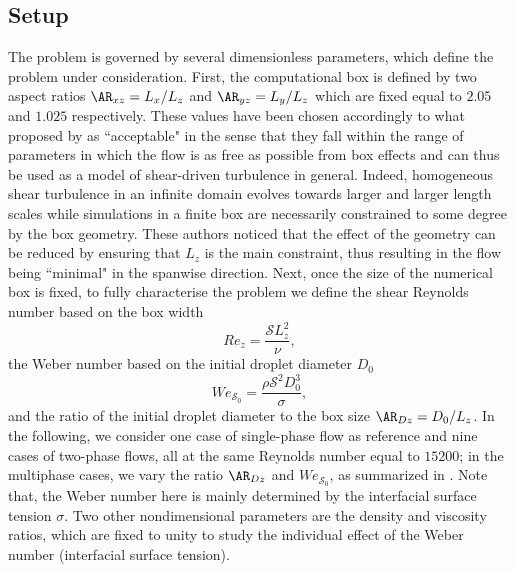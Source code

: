 \subsection{Setup}
The problem is governed by several dimensionless parameters, which define the problem under consideration. First, the computational box is defined by two aspect ratios $\AR_{xz} = L_x/L_z$ and $\AR_{yz} = L_y/L_z$ which are fixed equal to $2.05$ and $1.025$ respectively. These values have been chosen accordingly to what proposed by \cite{sekimoto_dong_jimenez_2016a} as ``acceptable" in the sense that they fall within the range of parameters in which the flow is as free as possible from box effects and can thus be used as a model of shear-driven turbulence in general. Indeed, homogeneous shear turbulence in an infinite domain evolves towards larger and larger length scales while simulations in a finite box are necessarily constrained to some degree by the box geometry. These authors noticed that the effect of the geometry can be reduced by ensuring that $L_z$ is the main constraint, thus resulting in the flow being ``minimal" in the spanwise direction. Next, once the size of the numerical box is fixed, to fully characterise the problem we define the shear Reynolds number based on the box width
\begin{equation}
Re_z = \frac{\mathcal{S} L_z^2}{\nu},
\end{equation}
the Weber number based on the initial droplet diameter $D_0$
\begin{equation}
\label{eq:wes}
We_{\mathcal{S}_0} = \frac{\rho \mathcal{S}^2 D_0^3}{\sigma},
\end{equation}
and the ratio of the initial droplet diameter to the box size $\AR_{Dz}=D_0/L_z$. In the following, we consider one case of single-phase flow as reference and nine cases of two-phase flows, all at the same Reynolds number equal to $15200$; in the multiphase cases, we vary the ratio $\AR_{Dz}$ and $We_{\mathcal{S}_0}$, as summarized in . Note that, the Weber number here is mainly determined by the interfacial surface tension $\sigma$. Two other nondimensional parameters are the density and viscosity ratios, which are fixed to unity to study the individual effect of the Weber number (interfacial surface tension).

